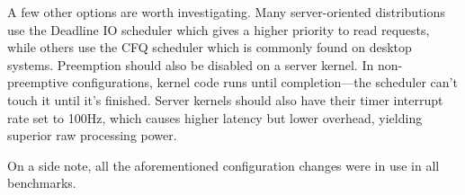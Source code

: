 A few other options are worth investigating. Many server-oriented distributions use the Deadline IO scheduler which gives a higher priority to read requests, while others use the CFQ scheduler which is commonly found on desktop systems. Preemption should also be disabled on a server kernel. In non-preemptive configurations, kernel code runs until completion---the scheduler can't touch it until it's finished. Server kernels should also have their timer interrupt rate set to 100Hz, which causes higher latency but lower overhead, yielding superior raw processing power.

On a side note, all the aforementioned configuration changes were in use in all benchmarks.
